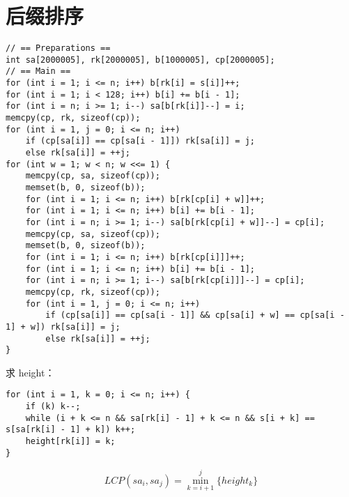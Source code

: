 \section{后缀排序}

\begin{verbatim}
// == Preparations ==
int sa[2000005], rk[2000005], b[1000005], cp[2000005];
// == Main ==
for (int i = 1; i <= n; i++) b[rk[i] = s[i]]++;
for (int i = 1; i < 128; i++) b[i] += b[i - 1];
for (int i = n; i >= 1; i--) sa[b[rk[i]]--] = i;
memcpy(cp, rk, sizeof(cp));
for (int i = 1, j = 0; i <= n; i++)
    if (cp[sa[i]] == cp[sa[i - 1]]) rk[sa[i]] = j;
    else rk[sa[i]] = ++j;
for (int w = 1; w < n; w <<= 1) {
    memcpy(cp, sa, sizeof(cp));
    memset(b, 0, sizeof(b));
    for (int i = 1; i <= n; i++) b[rk[cp[i] + w]]++;
    for (int i = 1; i <= n; i++) b[i] += b[i - 1];
    for (int i = n; i >= 1; i--) sa[b[rk[cp[i] + w]]--] = cp[i];
    memcpy(cp, sa, sizeof(cp));
    memset(b, 0, sizeof(b));
    for (int i = 1; i <= n; i++) b[rk[cp[i]]]++;
    for (int i = 1; i <= n; i++) b[i] += b[i - 1];
    for (int i = n; i >= 1; i--) sa[b[rk[cp[i]]]--] = cp[i];
    memcpy(cp, rk, sizeof(cp));
    for (int i = 1, j = 0; i <= n; i++)
        if (cp[sa[i]] == cp[sa[i - 1]] && cp[sa[i] + w] == cp[sa[i - 1] + w]) rk[sa[i]] = j;
        else rk[sa[i]] = ++j;
}
\end{verbatim}

求 height：

\begin{verbatim}
for (int i = 1, k = 0; i <= n; i++) {
    if (k) k--;
    while (i + k <= n && sa[rk[i] - 1] + k <= n && s[i + k] == s[sa[rk[i] - 1] + k]) k++;
    height[rk[i]] = k;
}
\end{verbatim}

$$
LCP(sa_i, sa_j) = \min\limits_{k = i + 1}^j \{height_k\}
$$